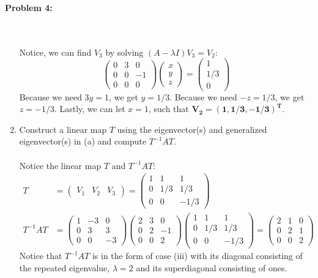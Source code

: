 \documentclass[11pt]{article}
\newenvironment{problem}[1]{\textbf{Problem #1: }}{\newpage}
\begin{document}
\begin{problem}{4}
\begin{enumerate}[label = (\alph*)]
			\\ \\
			Notice, we can find $V_3$ by solving $(A - \lambda I)V_3 = V_2$:
			\[\begin{pmatrix}
				0 & 3 & 0 \\ 0 & 0 & -1 \\ 0 & 0 & 0
			\end{pmatrix}\begin{pmatrix}
				x \\ y \\ z
			\end{pmatrix} = \begin{pmatrix}
				1 \\ 1/3 \\ 0
			\end{pmatrix}\]
			Because we need $3y = 1$, we get $y = 1/3$.  Because we need $-z = 1 /3$, we get $z = -1/3$.  Lastly, we can let $x = 1$, such that $\boldsymbol{V_2 = (1 , 1/3, -1/3)^T}$.
			\\ 
			\item Construct a linear map $T$ using the eigenvector(s) and generalized eigenvector(s) in (a) and compute $T^{-1}AT$. 
			\\ \\
			Notice the linear map $T$ and $T^{-1}AT$:
			\begin{align*}
				T &= \left(\begin{array}{ccc}
					V_1 & V_2 & V_3
				\end{array}\right) = \begin{pmatrix}
					1 & 1 & 1 \\ 0 & 1/3 & 1/3 \\ 0 & 0 & -1/3	
				\end{pmatrix} \\
				T^{-1}AT &= \begin{pmatrix}
					1 & -3 & 0 \\ 0 & 3 & 3 \\ 0 & 0 & -3	
				\end{pmatrix}\begin{pmatrix}
					2 & 3 & 0 \\ 0 & 2 & -1 \\ 0 & 0 & 2
				\end{pmatrix}\begin{pmatrix}
					1 & 1 & 1 \\ 0 & 1/3 & 1/3 \\ 0 & 0 & -1/3	
				\end{pmatrix} = \begin{pmatrix}
					2 & 1 & 0 \\ 0 & 2 & 1 \\ 0 & 0 & 2	
				\end{pmatrix}
			\end{align*}
			Notice that $T^{-1}AT$ is in the form of case (iii) with its diagonal consisting of the repeated eigenvalue, $\lambda = 2$ and its superdiagonal consisting of ones.
		\end{enumerate}
	\end{problem}
\end{document}

